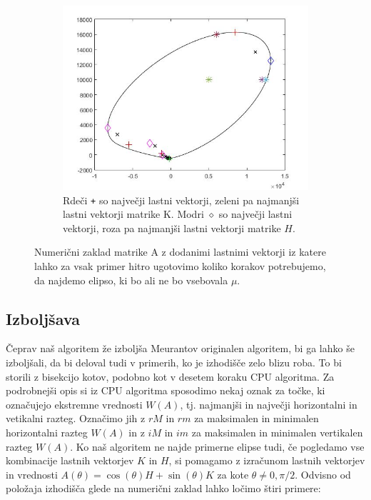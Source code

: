 \documentclass[12pt,a4paper]{amsart}
\theoremstyle{definition}
\theoremstyle{plain}
\begin{document}
\begin{figure}[H]
\begin{subfigure}[t]{0.5\textwidth}
\end{subfigure}%
\hfill
\begin{subfigure}[t]{0.5\textwidth}
\includegraphics[width=0.9\linewidth]{CCC.jpg}
\caption{Rdeči \verb~+~ so največji lastni vektorji, zeleni pa najmanjši lastni vektorji matrike K. Modri $\diamond$ so največji lastni vektorji, roza pa najmanjši lastni vektorji matrike $H$.\footnotemark[\value{footnote}]}
\end{subfigure}
\caption{Numerični zaklad matrike A z dodanimi lastnimi vektorji iz katere lahko za vsak primer hitro ugotovimo koliko korakov potrebujemo, da najdemo elipso, ki bo ali ne bo vsebovala $\mu$.}
\label{fig:p7}
\end{figure}

\subsection{Izboljšava}
Čeprav naš algoritem že izboljša Meurantov originalen algoritem, bi ga lahko še izboljšali, da bi deloval tudi v primerih, ko je izhodišče zelo blizu roba.
To bi storili z bisekcijo kotov, podobno kot v desetem koraku CPU algoritma.
Za podrobnejši opis si iz CPU algoritma sposodimo nekaj oznak za točke, ki označujejo ekstremne vrednosti $W(A)$, tj. najmanjši in največji horizontalni in vetikalni razteg. 
Označimo jih z $rM$ in $rm$ za maksimalen in minimalen horizontalni razteg $W(A)$ in z $iM$ in $im$ za maksimalen in minimalen vertikalen razteg $W(A)$.
Ko naš algoritem ne najde primerne elipse tudi, če pogledamo vse kombinacije lastnih vektorjev $K$ in $H$, si pomagamo z izračunom lastnih vektorjev in vrednosti $A(\theta)=\cos(\theta)H+\sin(\theta)K$ za kote $\theta \not =0,\pi/2$.
Odvisno od položaja izhodišča glede na numerični zaklad lahko ločimo štiri primere:
\end{document}
